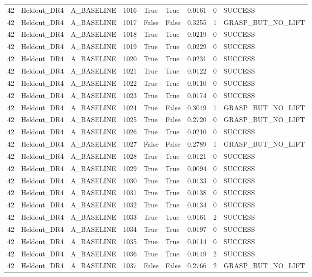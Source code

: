 \documentclass[11pt,a4paper,oneside]{book}
\begin{document}
\begin{longtable}{l l l l l l l l l}
42 & Heldout\_DR4 & A\_BASELINE & 1016 & True & True & 0.0161 & 0 & SUCCESS \\
42 & Heldout\_DR4 & A\_BASELINE & 1017 & False & False & 0.3255 & 1 & GRASP\_BUT\_NO\_LIFT \\
42 & Heldout\_DR4 & A\_BASELINE & 1018 & True & True & 0.0219 & 0 & SUCCESS \\
42 & Heldout\_DR4 & A\_BASELINE & 1019 & True & True & 0.0229 & 0 & SUCCESS \\
42 & Heldout\_DR4 & A\_BASELINE & 1020 & True & True & 0.0231 & 0 & SUCCESS \\
42 & Heldout\_DR4 & A\_BASELINE & 1021 & True & True & 0.0122 & 0 & SUCCESS \\
42 & Heldout\_DR4 & A\_BASELINE & 1022 & True & True & 0.0110 & 0 & SUCCESS \\
42 & Heldout\_DR4 & A\_BASELINE & 1023 & True & True & 0.0174 & 0 & SUCCESS \\
42 & Heldout\_DR4 & A\_BASELINE & 1024 & True & False & 0.3049 & 1 & GRASP\_BUT\_NO\_LIFT \\
42 & Heldout\_DR4 & A\_BASELINE & 1025 & True & False & 0.2720 & 0 & GRASP\_BUT\_NO\_LIFT \\
42 & Heldout\_DR4 & A\_BASELINE & 1026 & True & True & 0.0210 & 0 & SUCCESS \\
42 & Heldout\_DR4 & A\_BASELINE & 1027 & False & False & 0.2789 & 1 & GRASP\_BUT\_NO\_LIFT \\
42 & Heldout\_DR4 & A\_BASELINE & 1028 & True & True & 0.0121 & 0 & SUCCESS \\
42 & Heldout\_DR4 & A\_BASELINE & 1029 & True & True & 0.0094 & 0 & SUCCESS \\
42 & Heldout\_DR4 & A\_BASELINE & 1030 & True & True & 0.0133 & 0 & SUCCESS \\
42 & Heldout\_DR4 & A\_BASELINE & 1031 & True & True & 0.0138 & 0 & SUCCESS \\
42 & Heldout\_DR4 & A\_BASELINE & 1032 & True & True & 0.0134 & 0 & SUCCESS \\
42 & Heldout\_DR4 & A\_BASELINE & 1033 & True & True & 0.0161 & 2 & SUCCESS \\
42 & Heldout\_DR4 & A\_BASELINE & 1034 & True & True & 0.0197 & 0 & SUCCESS \\
42 & Heldout\_DR4 & A\_BASELINE & 1035 & True & True & 0.0114 & 0 & SUCCESS \\
42 & Heldout\_DR4 & A\_BASELINE & 1036 & True & True & 0.0149 & 2 & SUCCESS \\
42 & Heldout\_DR4 & A\_BASELINE & 1037 & False & False & 0.2766 & 2 & GRASP\_BUT\_NO\_LIFT \\

\end{longtable}
\end{document}
